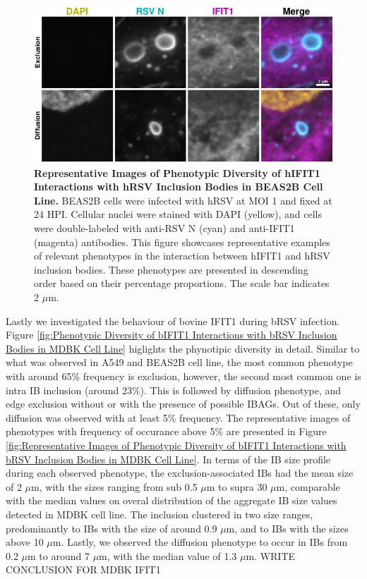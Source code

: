 \begin{figure}
    \centering
    \includegraphics[width=1\linewidth]{08. Chapter 3/Figs/02. Infection/01. IFIT1/06. beas2b i1.pdf}
    \caption[Representative Images of Phenotypic Diversity of hIFIT1 Interactions with hRSV Inclusion Bodies in BEAS2B Cell Line.]{\textbf{Representative Images of Phenotypic Diversity of hIFIT1 Interactions with hRSV Inclusion Bodies in BEAS2B Cell Line.} BEAS2B cells were infected with hRSV at MOI 1 and fixed at 24 HPI. Cellular nuclei were stained with DAPI (yellow), and cells were double-labeled with anti-RSV N (cyan) and anti-IFIT1 (magenta) antibodies. This figure showcases representative examples of relevant phenotypes in the interaction between hIFIT1 and hRSV inclusion bodies. These phenotypes are presented in descending order based on their percentage proportions. The scale bar indicates 2 \(\mu \mbox{m}\).}
    \label{fig:Representative Images of Phenotypic Diversity of hIFIT1 Interactions with hRSV Inclusion Bodies in BEAS2B Cell Line}
\end{figure}

Lastly we investigated the behaviour of bovine IFIT1 during bRSV infection. Figure \ref{fig:Phenotypic Diversity of bIFIT1 Interactions with bRSV Inclusion Bodies in MDBK Cell Line} higlights the phynotipic diversity in detail. Similar to what was observed in A549 and BEAS2B cell line, the most common phenotype with around 65\% frequency is exclusion, however, the second most common one is intra IB inclusion (around 23\%). This is followed by diffusion phenotype, and edge exclusion without or with the presence of possible IBAGs. Out of these, only diffusion was observed with at least 5\% frequency. The representative images of phenotypes with frequency of occurance above 5\% are presented in Figure \ref{fig:Representative Images of Phenotypic Diversity of bIFIT1 Interactions with bRSV Inclusion Bodies in MDBK Cell Line}. In terms of the IB size profile during each observed phenotype, the exclusion-associated IBs had the mean size of 2 \(\mu \mbox{m}\), with the sizes ranging from sub 0.5 \(\mu \mbox{m}\) to supra 30 \(\mu \mbox{m}\), comparable with the median values on overal distribution of the aggregate IB size values detected in MDBK cell line. The inclusion clustered in two size ranges, predominantly to IBs with the size of around 0.9 \(\mu \mbox{m}\), and to IBs with the sizes above 10 \(\mu \mbox{m}\). Lastly, we observed the diffusion phenotype to occur in IBs from 0.2 \(\mu \mbox{m}\) to around 7 \(\mu \mbox{m}\), with the median value of 1.3 \(\mu \mbox{m}\). WRITE CONCLUSION FOR MDBK IFIT1

